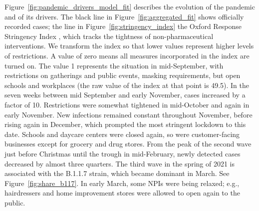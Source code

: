 Figure~\ref{fig:pandemic_drivers_model_fit} describes the evolution of the pandemic and
of its drivers. The black line in Figure~\ref{fig:aggregated_fit} shows officially
recorded cases; the  line in
Figure~\ref{fig:stringency_index} the Oxford Response Stringency Index \citep{Hale2020},
which tracks the tightness of non-pharmaceutical interventions. We transform the index
so that lower values represent higher levels of restrictions. A value of zero means all
measures incorporated in the index are turned on. The value 1 represents the situation
in mid-September, with restrictions on gatherings and public events, masking
requirements, but open schools and workplaces (the raw value of the index at that point
is 49.5). In the seven weeks between mid September and early November, cases increased
by a factor of 10. Restrictions were somewhat tightened in mid-October and again in
early November. New infections remained constant throughout November, before rising
again in December, which prompted the most stringent lockdown to this date. Schools and
daycare centers were closed again, so were customer-facing businesses except for grocery
and drug stores. From the peak of the second wave just before Christmas until the trough
in mid-February, newly detected cases decreased by almost three quarters. The third wave
in the spring of 2021 is associated with the B.1.1.7 strain, which became dominant in
March. See Figure~\ref{fig:share_b117}. In early March, some NPIs were being relaxed;
e.g., hairdressers and home improvement stores were allowed to open again to the public.


